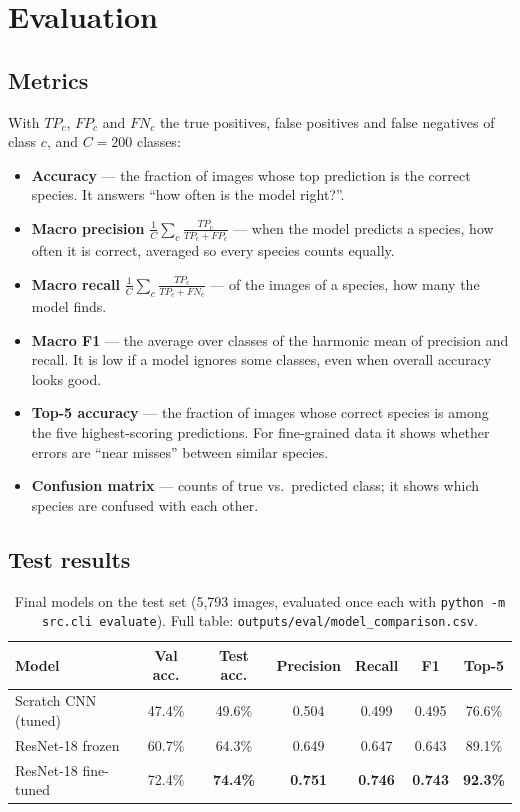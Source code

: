 \documentclass[11pt,a4paper]{article}
\begin{document}
\section{Evaluation}

\subsection{Metrics}

With $TP_c$, $FP_c$ and $FN_c$ the true positives, false positives and false
negatives of class $c$, and $C = 200$ classes:
\begin{itemize}
  \item \textbf{Accuracy} --- the fraction of images whose top prediction is
        the correct species. It answers ``how often is the model right?''.
  \item \textbf{Macro precision} $\frac{1}{C}\sum_c \frac{TP_c}{TP_c+FP_c}$ ---
        when the model predicts a species, how often it is correct, averaged
        so every species counts equally.
  \item \textbf{Macro recall} $\frac{1}{C}\sum_c \frac{TP_c}{TP_c+FN_c}$ --- of
        the images of a species, how many the model finds.
  \item \textbf{Macro F1} --- the average over classes of the harmonic mean of
        precision and recall. It is low if a model ignores some classes, even
        when overall accuracy looks good.
  \item \textbf{Top-5 accuracy} --- the fraction of images whose correct
        species is among the five highest-scoring predictions. For
        fine-grained data it shows whether errors are ``near misses''
        between similar species.
  \item \textbf{Confusion matrix} --- counts of true vs.\ predicted class; it
        shows which species are confused with each other.
\end{itemize}

\subsection{Test results}

\begin{table}[H]
\centering
\caption{Final models on the test set (5,793 images, evaluated once each with
\texttt{python -m src.cli evaluate}). Full table:
\texttt{outputs/eval/model\_comparison.csv}.}
\label{tab:test}
\begin{tabular}{lcccccc}
\toprule
Model & Val acc. & Test acc. & Precision & Recall & F1 & Top-5 \\
\midrule
Scratch CNN (tuned) & 47.4\% & 49.6\% & 0.504 & 0.499 & 0.495 & 76.6\% \\
ResNet-18 frozen & 60.7\% & 64.3\% & 0.649 & 0.647 & 0.643 & 89.1\% \\
ResNet-18 fine-tuned & 72.4\% & \textbf{74.4\%} & \textbf{0.751} & \textbf{0.746} & \textbf{0.743} & \textbf{92.3\%} \\
\bottomrule
\end{tabular}
\end{table}
\end{document}
